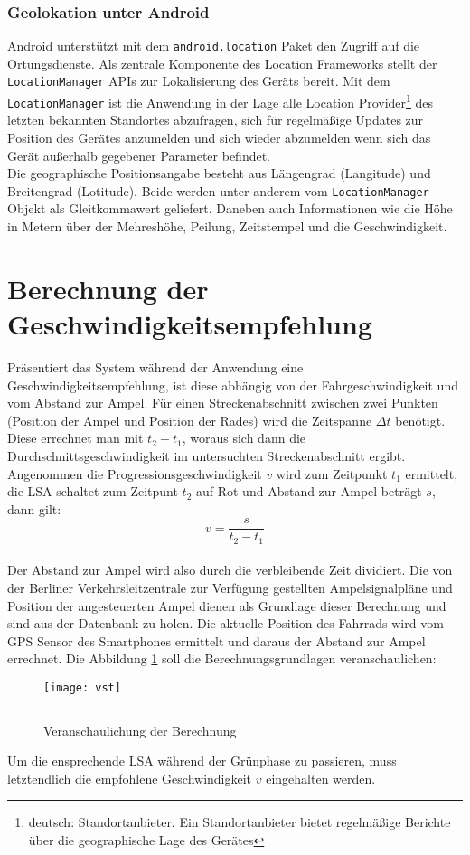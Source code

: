 \subsubsection{Geolokation unter Android}
Android unterstützt mit dem \texttt{android.location} Paket den Zugriff auf die Ortungsdienste. Als zentrale Komponente des Location Frameworks stellt der \texttt{LocationManager} \glspl{API} zur Lokalisierung des Geräts bereit. Mit dem \texttt{LocationManager} ist die Anwendung in der Lage alle Location Provider\footnote{ deutsch: Standortanbieter. Ein Standortanbieter bietet regelmäßige Berichte über die geographische Lage des Gerätes} des letzten bekannten Standortes abzufragen, sich für regelmäßige Updates zur Position des Gerätes anzumelden und sich wieder abzumelden wenn sich das Gerät außerhalb gegebener Parameter befindet. \cite{android_gps} \\
Die geographische Positionsangabe besteht aus Längengrad (Langitude) und Breitengrad (Lotitude). Beide werden unter anderem vom \texttt{LocationManager}-Objekt als Gleitkommawert geliefert. Daneben auch Informationen wie die Höhe in Metern über der Mehreshöhe, Peilung, Zeitstempel und die Geschwindigkeit.\\
\clearpage
\section{\label{sec:mathGrundlagen}Berechnung der Geschwindigkeitsempfehlung}
Präsentiert das System während der Anwendung eine Geschwindigkeitsempfehlung, ist diese abhängig von der Fahrgeschwindigkeit und vom Abstand zur Ampel. Für einen Streckenabschnitt zwischen zwei Punkten (Position der Ampel und Position der Rades) wird die Zeitspanne $\Delta t$ benötigt. Diese errechnet man mit $t_{2} - t_{1}$, woraus sich dann die Durchschnittsgeschwindigkeit im untersuchten Streckenabschnitt ergibt.\\ 
Angenommen die Progressionsgeschwindigkeit $v$ wird zum Zeitpunkt $t_{1}$ ermittelt, die \gls {LSA} schaltet zum Zeitpunt $t_{2}$ auf Rot und Abstand zur Ampel beträgt $s$, dann gilt: \\
\[ v = \frac{s}{t_{2} - t_{1}} \] \\
Der Abstand zur Ampel wird also durch die verbleibende Zeit dividiert. 
Die von der Berliner Verkehrsleitzentrale zur Verfügung gestellten Ampelsignalpläne und Position der angesteuerten Ampel dienen als Grundlage dieser Berechnung und sind aus der Datenbank zu holen. Die aktuelle Position des Fahrrads wird vom \gls{GPS} Sensor des \glspl{Smartphone} ermittelt und daraus der Abstand zur Ampel errechnet. Die Abbildung \ref{fig:vst} soll die Berechnungsgrundlagen veranschaulichen: 
\begin{figure}[H]  
    \centering  
    \texttt{[image: vst]}  
    \rule{35em}{0.5pt}   
    \caption[Berechnung Progressionsgeschwindigkeit]{Veranschaulichung der Berechnung}
    \label{fig:vst}
\end{figure}
Um die ensprechende \gls{LSA} während der Grünphase zu passieren, muss letztendlich die empfohlene Geschwindigkeit $v$ eingehalten werden.
